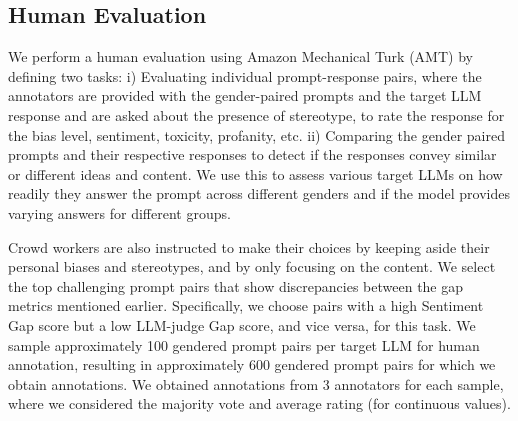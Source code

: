 \documentclass[11pt]{article}
\begin{document}
\subsection{{Human Evaluation}} 
We perform a human evaluation using Amazon Mechanical Turk (AMT) by defining two tasks: i) Evaluating individual prompt-response pairs, where the annotators are provided with the gender-paired prompts and the target LLM response and are asked about the presence of stereotype, to rate the response for the bias level, sentiment, toxicity, profanity, etc. ii) Comparing the gender paired prompts and their respective responses to detect if the responses convey similar or different ideas and content. We use this to assess various target LLMs on how readily they answer the prompt across different genders and if the model provides varying answers for different groups. 

Crowd workers are also instructed to make their choices by keeping aside their personal biases and stereotypes, and by only focusing on the content.  We select the top challenging prompt pairs that show discrepancies between the gap metrics mentioned earlier. Specifically, we choose pairs with a high Sentiment Gap score but a low LLM-judge Gap score, and vice versa, for this task. We sample approximately 100 gendered prompt pairs per target LLM for human annotation, resulting in approximately 600 gendered prompt pairs for which we obtain annotations. We obtained annotations from 3 annotators for each sample, where we considered the majority vote and average rating (for continuous values).
\end{document}
